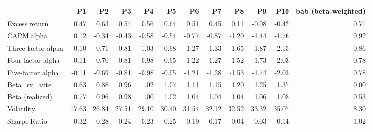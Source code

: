 \begin{tabular}{lrrrrrrrrrrr}
\toprule
{} &     P1 &     P2 &     P3 &     P4 &     P5 &     P6 &     P7 &     P8 &     P9 &    P10 &  bab (beta-weighted) \\
\midrule
Excess return      &   0.47 &   0.63 &   0.54 &   0.56 &   0.64 &   0.51 &   0.45 &   0.11 &  -0.08 &  -0.42 &                 0.71 \\
CAPM alpha         &   0.12 &  -0.34 &  -0.43 &  -0.58 &  -0.54 &  -0.77 &  -0.87 &  -1.20 &  -1.44 &  -1.76 &                 0.92 \\
Three-factor alpha &  -0.10 &  -0.71 &  -0.81 &  -1.03 &  -0.98 &  -1.27 &  -1.33 &  -1.65 &  -1.87 &  -2.15 &                 0.86 \\
Four-factor alpha  &  -0.11 &  -0.70 &  -0.81 &  -0.98 &  -0.95 &  -1.22 &  -1.27 &  -1.52 &  -1.73 &  -2.03 &                 0.78 \\
Five-factor alpha  &  -0.11 &  -0.69 &  -0.81 &  -0.98 &  -0.95 &  -1.21 &  -1.28 &  -1.53 &  -1.74 &  -2.03 &                 0.78 \\
Beta\_ex\_ante       &   0.63 &   0.88 &   0.96 &   1.02 &   1.07 &   1.11 &   1.15 &   1.20 &   1.25 &   1.37 &                 0.00 \\
Beta (realized)    &   0.77 &   0.96 &   0.98 &   1.00 &   1.02 &   1.04 &   1.04 &   1.04 &   1.06 &   1.08 &                 0.53 \\
Volatility         &  17.63 &  26.84 &  27.51 &  29.10 &  30.40 &  31.54 &  32.12 &  32.52 &  33.32 &  35.07 &                 8.30 \\
Sharpe Ratio       &   0.32 &   0.28 &   0.24 &   0.23 &   0.25 &   0.19 &   0.17 &   0.04 &  -0.03 &  -0.14 &                 1.02 \\
\bottomrule
\end{tabular}

